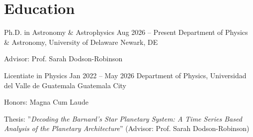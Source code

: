 \section{Education}

\resumeEduEntry
    {Ph.D. in Astronomy \& Astrophysics}
    {Aug 2026 – Present}
    {Department of Physics \& Astronomy, University of Delaware}
    {Newark, DE}
    {
        \item Advisor: Prof. Sarah Dodson-Robinson
    }

\resumeEduEntry
    {Licentiate in Physics}
    {Jan 2022 – May 2026}
    {Department of Physics, Universidad del Valle de Guatemala}
    {Guatemala City}
    {
        \item Honors: Magna Cum Laude
        \item Thesis: ''\textit{Decoding the Barnard's Star Planetary System: A Time Series Based Analysis of the Planetary Architecture}'' (Advisor: Prof. Sarah Dodson-Robinson)
    }
